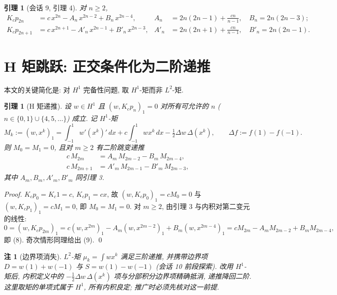 \documentclass[UTF8]{ctexart}
\newtheorem{lemma}[theorem]{引理}
\newtheorem{remark}[theorem]{注}
\begin{document}
\begin{lemma}[会话 9, 引理 4]
对 $n \geq 2$,
\begin{align}
	K_c p_{2n} &= c\, x^{2n} - A_n\, x^{2n-2} + B_n\, x^{2n-4},
	& A_n &= 2n(2n-1) + \frac{cn}{n-1}, \quad B_n = 2n(2n-3); \\
	K_c p_{2n+1} &= c\, x^{2n+1} - A'_n\, x^{2n-1} + B'_n\, x^{2n-3},
	& A'_n &= 2n(2n+1) + \frac{cn}{n-1}, \quad B'_n = 2n(2n-1).
\end{align}
\end{lemma}

\section{H 矩跳跃: 正交条件化为二阶递推}

本文的关键简化是: 对 $H^1$ 完备性问题, 取 $H^1$-矩而非 $L^2$-矩.

\begin{lemma}[H 矩递推]
设 $w \in H^1$ 且 $(w, K_c p_n)_1 = 0$ 对所有可允许的 $n$
($n \in \{0,1\} \cup \{4,5,\dots\}$) 成立. 记 $H^1$-矩
\begin{equation}
	M_k := (w, x^k)_1 = \int_{-1}^{1} w'(x^k)'\, dx + c \int_{-1}^{1} w x^k\, dx
		- \tfrac12 \Delta w\, \Delta(x^k),
	\qquad \Delta f := f(1) - f(-1).
\end{equation}
则 $M_0 = M_1 = 0$, 且对 $m \geq 2$ 有\emph{二阶}跳变递推
\begin{align}
	c\, M_{2m} &= A_m\, M_{2m-2} - B_m\, M_{2m-4}, \\
	c\, M_{2m+1} &= A'_m\, M_{2m-1} - B'_m\, M_{2m-3},
\end{align}
其中 $A_m, B_m, A'_m, B'_m$ 同引理 3.
\end{lemma}

\begin{proof}
$K_c p_0 = K_c 1 = c$, $K_c p_1 = c x$, 故
$(w, K_c p_0)_1 = c M_0 = 0$ 与 $(w, K_c p_1)_1 = c M_1 = 0$, 即 $M_0 = M_1 = 0$.
对 $m \geq 2$, 由引理 3 与内积对第二变元的线性:
\[
	0 = (w, K_c p_{2m})_1 = c (w, x^{2m})_1 - A_m (w, x^{2m-2})_1
		+ B_m (w, x^{2m-4})_1 = c M_{2m} - A_m M_{2m-2} + B_m M_{2m-4},
\]
即 (8). 奇次情形同理给出 (9). \qed
\end{proof}

\begin{remark}[边界项消失]
$L^2$-矩 $\mu_k = \int w x^k$ 满足三阶递推, 并携带边界项
$D = w(1)+w(-1)$ 与 $S = w(1)-w(-1)$ (会话 10 前段探索). 改用 $H^1$-矩后,
内积定义中的 $- \tfrac12 \Delta w\, \Delta(x^k)$ 项与分部积分边界项精确抵消,
递推降回二阶. 这里取矩的单项式属于 $H^1$, 所有内积良定; 推广时必须先核对这一前提.
\end{remark}
\end{document}
